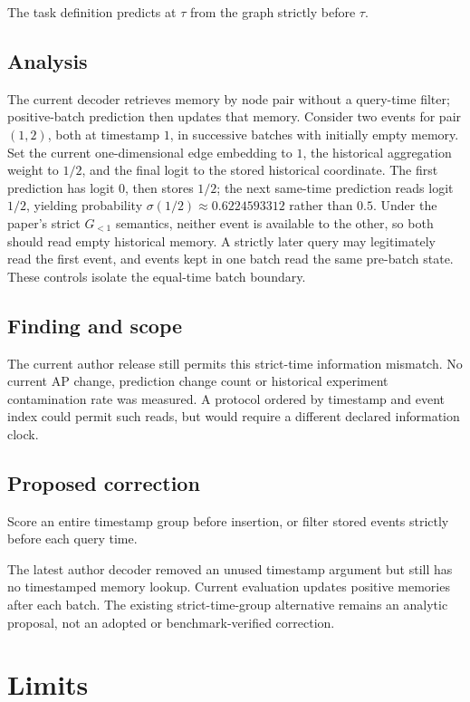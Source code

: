 \documentclass[11pt]{article}
\begin{document}
The task definition predicts at \(\tau\) from the graph strictly before \(\tau\).

\subsection*{Analysis}

The current decoder retrieves memory by node pair without a query-time filter; positive-batch prediction then updates that memory. Consider two events for pair \((1,2)\), both at timestamp \(1\), in successive batches with initially empty memory. Set the current one-dimensional edge embedding to \(1\), the historical aggregation weight to \(1/2\), and the final logit to the stored historical coordinate. The first prediction has logit \(0\), then stores \(1/2\); the next same-time prediction reads logit \(1/2\), yielding probability \(\sigma(1/2)\approx0.6224593312\) rather than \(0.5\). Under the paper’s strict \(G_{<1}\) semantics, neither event is available to the other, so both should read empty historical memory. A strictly later query may legitimately read the first event, and events kept in one batch read the same pre-batch state. These controls isolate the equal-time batch boundary.

\subsection*{Finding and scope}

The current author release still permits this strict-time information mismatch. No current AP change, prediction change count or historical experiment contamination rate was measured. A protocol ordered by timestamp and event index could permit such reads, but would require a different declared information clock.

\subsection*{Proposed correction}

Score an entire timestamp group before insertion, or filter stored events strictly before each query time.

The latest author decoder removed an unused timestamp argument but still has no timestamped memory lookup. Current evaluation updates positive memories after each batch. The existing strict-time-group alternative remains an analytic proposal, not an adopted or benchmark-verified correction.

\section*{Limits}
\end{document}
